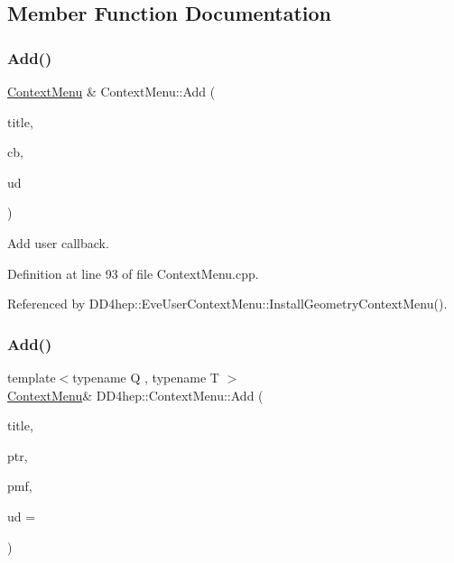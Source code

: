 \subsection{Member Function Documentation}
\hypertarget{class_d_d4hep_1_1_context_menu_a3345427ddd214ddcd9cf382ac89295ca}{}\label{class_d_d4hep_1_1_context_menu_a3345427ddd214ddcd9cf382ac89295ca} 
\subsubsection{\texorpdfstring{Add()}{Add()}\hspace{0.1cm}{\footnotesize\ttfamily [1/2]}}
{\footnotesize\ttfamily \hyperlink{class_d_d4hep_1_1_context_menu}{Context\+Menu} \& Context\+Menu\+::\+Add (\begin{DoxyParamCaption}\item[{const std\+::string \&}]{title,  }\item[{\hyperlink{class_d_d4hep_1_1_callback}{Callback}}]{cb,  }\item[{void $\ast$}]{ud }\end{DoxyParamCaption})\hspace{0.3cm}{\ttfamily [private]}}



Add user callback. 



Definition at line 93 of file Context\+Menu.\+cpp.



Referenced by D\+D4hep\+::\+Eve\+User\+Context\+Menu\+::\+Install\+Geometry\+Context\+Menu().

\hypertarget{class_d_d4hep_1_1_context_menu_acaf0044dc8d09c404a520598f6e1c87b}{}\label{class_d_d4hep_1_1_context_menu_acaf0044dc8d09c404a520598f6e1c87b} 
\subsubsection{\texorpdfstring{Add()}{Add()}\hspace{0.1cm}{\footnotesize\ttfamily [2/2]}}
{\footnotesize\ttfamily template$<$typename Q , typename T $>$ \\
\hyperlink{class_d_d4hep_1_1_context_menu}{Context\+Menu}\& D\+D4hep\+::\+Context\+Menu\+::\+Add (\begin{DoxyParamCaption}\item[{const std\+::string \&}]{title,  }\item[{Q $\ast$}]{ptr,  }\item[{void(T\+::$\ast$)(\hyperlink{class_t_object}{T\+Object} $\ast$, void $\ast$ud)}]{pmf,  }\item[{void $\ast$}]{ud = {} }\end{DoxyParamCaption})\hspace{0.3cm}{\ttfamily [inline]}}



